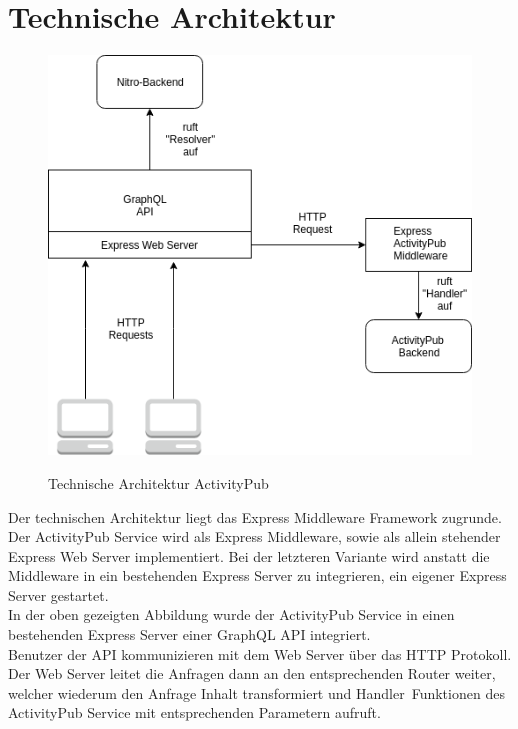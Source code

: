 \section{Technische Architektur}
	\begin{figure}[h]
		\centering
		\includegraphics[scale=0.6]{figures/technische-architektur-activitypub.png}
		\label{technische-architektur-activitypub}
		\caption{Technische Architektur ActivityPub}
	\end{figure}
	Der technischen Architektur liegt das Express Middleware Framework zugrunde. Der ActivityPub Service wird als Express Middleware, sowie als allein stehender Express Web Server implementiert. Bei der letzteren Variante wird anstatt die Middleware in ein bestehenden Express Server zu integrieren, ein eigener Express Server gestartet.\\
	
	In der oben gezeigten Abbildung wurde der ActivityPub Service in einen bestehenden Express Server einer GraphQL API integriert.\\
	
	Benutzer der API kommunizieren mit dem Web Server über das HTTP Protokoll. Der Web Server leitet die Anfragen dann an den entsprechenden Router weiter, welcher wiederum den Anfrage Inhalt transformiert und \glqq Handler\grqq~Funktionen des ActivityPub Service mit entsprechenden Parametern aufruft.\\
	
